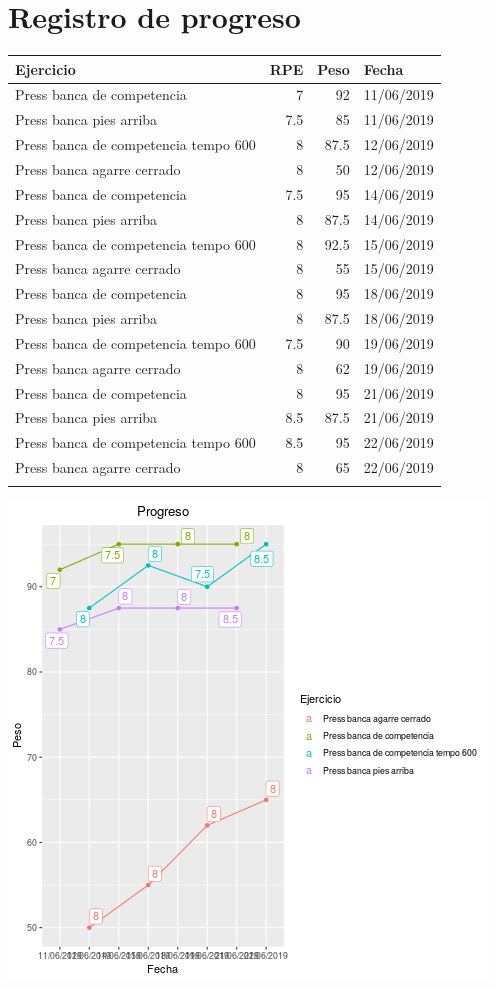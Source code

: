 \documentclass[11pt]{article}
\begin{document}
\section{Registro de progreso}
\label{sec:orgd2c4d62}
\begin{center}
\label{tab:org838e368}
\begin{tabular}{lrrl}
Ejercicio & RPE & Peso & Fecha\\
\hline
Press banca de competencia & 7 & 92 & 11/06/2019\\
Press banca pies arriba & 7.5 & 85 & 11/06/2019\\
Press banca de competencia tempo 600 & 8 & 87.5 & 12/06/2019\\
Press banca agarre cerrado & 8 & 50 & 12/06/2019\\
Press banca de competencia & 7.5 & 95 & 14/06/2019\\
Press banca pies arriba & 8 & 87.5 & 14/06/2019\\
Press banca de competencia tempo 600 & 8 & 92.5 & 15/06/2019\\
Press banca agarre cerrado & 8 & 55 & 15/06/2019\\
Press banca de competencia & 8 & 95 & 18/06/2019\\
Press banca pies arriba & 8 & 87.5 & 18/06/2019\\
Press banca de competencia tempo 600 & 7.5 & 90 & 19/06/2019\\
Press banca agarre cerrado & 8 & 62 & 19/06/2019\\
Press banca de competencia & 8 & 95 & 21/06/2019\\
Press banca pies arriba & 8.5 & 87.5 & 21/06/2019\\
Press banca de competencia tempo 600 & 8.5 & 95 & 22/06/2019\\
Press banca agarre cerrado & 8 & 65 & 22/06/2019\\
 &  &  & \\
\end{tabular}
\end{center}
\begin{center}
\includegraphics[width=.9\linewidth]{tmp.png}
\end{center}
\end{document}
